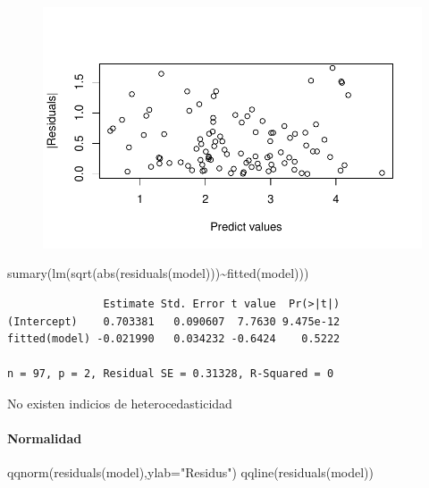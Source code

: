 \documentclass[
  letterpaper,
  DIV=11,
  numbers=noendperiod]{scrartcl}
\let\oldparagraph\paragraph
\renewcommand{\paragraph}[1]{\oldparagraph{#1}\mbox{}}
\newenvironment{Shaded}{\begin{snugshade}}{\end{snugshade}}
\newcommand{\AttributeTok}[1]{\textcolor[rgb]{0.40,0.45,0.13}{#1}}
\newcommand{\FunctionTok}[1]{\textcolor[rgb]{0.28,0.35,0.67}{#1}}
\newcommand{\NormalTok}[1]{\textcolor[rgb]{0.00,0.23,0.31}{#1}}
\newcommand{\SpecialCharTok}[1]{\textcolor[rgb]{0.37,0.37,0.37}{#1}}
\newcommand{\StringTok}[1]{\textcolor[rgb]{0.13,0.47,0.30}{#1}}
\begin{document}
\begin{figure}[H]

{\centering \includegraphics{Regresion-Lineal_files/figure-pdf/unnamed-chunk-15-1.pdf}

}

\end{figure}

\begin{Shaded}
\begin{Highlighting}[]
\FunctionTok{sumary}\NormalTok{(}\FunctionTok{lm}\NormalTok{(}\FunctionTok{sqrt}\NormalTok{(}\FunctionTok{abs}\NormalTok{(}\FunctionTok{residuals}\NormalTok{(model)))}\SpecialCharTok{\textasciitilde{}}\FunctionTok{fitted}\NormalTok{(model)))}
\end{Highlighting}
\end{Shaded}

\begin{verbatim}
               Estimate Std. Error t value  Pr(>|t|)
(Intercept)    0.703381   0.090607  7.7630 9.475e-12
fitted(model) -0.021990   0.034232 -0.6424    0.5222

n = 97, p = 2, Residual SE = 0.31328, R-Squared = 0
\end{verbatim}

No existen indicios de heterocedasticidad

\hypertarget{normalidad}{%
\paragraph{Normalidad}\label{normalidad}}

\begin{Shaded}
\begin{Highlighting}[]
\FunctionTok{qqnorm}\NormalTok{(}\FunctionTok{residuals}\NormalTok{(model),}\AttributeTok{ylab=}\StringTok{"Residus"}\NormalTok{)}
\FunctionTok{qqline}\NormalTok{(}\FunctionTok{residuals}\NormalTok{(model))}
\end{Highlighting}
\end{Shaded}
\end{document}
